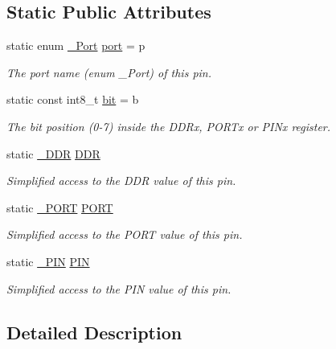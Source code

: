 \subsection*{Static Public Attributes}
\begin{DoxyCompactItemize}
\item 
static enum \hyperlink{namespaceports_a9949317f344930bd6ad1097e80c97b67}{\+\_\+\+Port} \hyperlink{structports_1_1Pin_ad63613b8c14441d28e3f3d935da67e77}{port} = p
\begin{DoxyCompactList}\small\item\em The port name (enum \+\_\+\+Port) of this pin. \end{DoxyCompactList}\item 
static const int8\+\_\+t \hyperlink{structports_1_1Pin_afd4a15583df02e1b3ba504c3e709a514}{bit} = b
\begin{DoxyCompactList}\small\item\em The bit position (0-\/7) inside the D\+D\+Rx, P\+O\+R\+Tx or P\+I\+Nx register. \end{DoxyCompactList}\item 
static \hyperlink{structports_1_1__Io}{\+\_\+\+D\+DR} \hyperlink{structports_1_1Pin_aaebb4d6cb5db0635fe8e7d6e7d315c7f}{D\+DR}
\begin{DoxyCompactList}\small\item\em Simplified access to the D\+DR value of this pin. \end{DoxyCompactList}\item 
static \hyperlink{structports_1_1__Io}{\+\_\+\+P\+O\+RT} \hyperlink{structports_1_1Pin_aaa08f0eb17ef31d9f46d65d50c8a093e}{P\+O\+RT}
\begin{DoxyCompactList}\small\item\em Simplified access to the P\+O\+RT value of this pin. \end{DoxyCompactList}\item 
static \hyperlink{structports_1_1__Io}{\+\_\+\+P\+IN} \hyperlink{structports_1_1Pin_ae2e45a41082457c350f71f7a720265d4}{P\+IN}
\begin{DoxyCompactList}\small\item\em Simplified access to the P\+IN value of this pin. \end{DoxyCompactList}\end{DoxyCompactItemize}


\subsection{Detailed Description}
